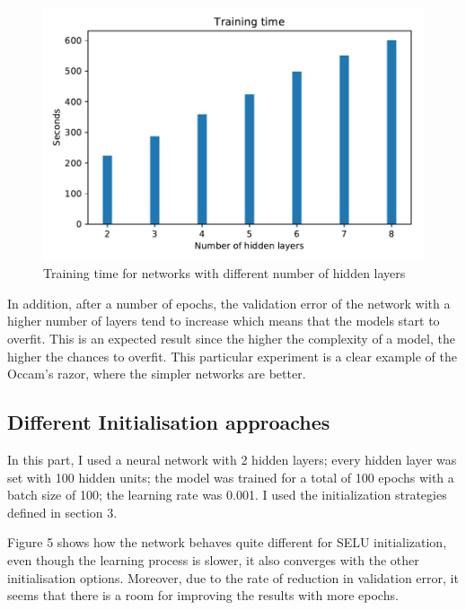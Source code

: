 \documentclass{article}
\begin{document}
\begin{figure}[tb]
\vskip 5mm
\begin{center}
\centerline{\includegraphics[width=\columnwidth]{training_time_mult_layers}}
\caption{Training time for networks with different number of hidden layers}
\label{fig:sample-graph}
\end{center}
\vskip -5mm
\end{figure} 

In addition, after a number of epochs, the validation error of the network with a higher number of layers tend to increase which means that the models start to overfit. This is an expected result since the higher the complexity of a model, the higher the chances to overfit. This particular experiment is a clear example of the Occam's razor, where the simpler networks are better.

\subsection{ Different Initialisation approaches}

In this part, I used a neural network with 2 hidden layers; every hidden layer was set with 100 hidden units; the model was trained for a total of 100 epochs with a batch size of 100; the learning rate was 0.001. I used the initialization strategies defined in section 3. 

Figure 5 shows how the network behaves quite different for SELU initialization, even though the learning process is slower, it also converges with the other initialisation options. Moreover, due to the rate of reduction in validation error, it seems that there is a room for improving the results with more epochs.
\end{document}
